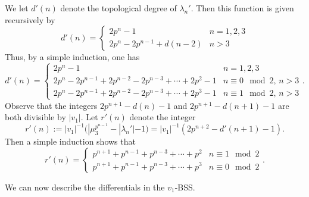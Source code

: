 We let $d'(n)$ denote the topological degree of $\lambda_n'$. Then this function is given recursively by 
\[
d'(n) = \begin{cases}
	2p^n-1 & n=1,2,3\\
	2p^n-2p^{n-1}+d(n-2) & n>3
\end{cases}
\]
Thus, by a simple induction, one has 
\[
d'(n) = \begin{cases}
	2p^n-1 & n=1,2,3\\
	2p^n-2p^{n-1}+2p^{n-2}-2p^{n-3}+\cdots + 2p^2-1 & n\equiv 0\mod 2,\, n>3\\
	2p^n-2p^{n-1}+ 2p^{n-2}-2p^{n-3}+\cdots + 2p^3-1& n\equiv 1\mod 2, \, n>3
\end{cases}.
\]
Observe that the integers $2p^{n+1}-d(n)-1$ and $2p^{n+1}-d(n+1)-1$ are both divisible by $|v_1|$. Let $r'(n)$ denote the integer 
\[
r'(n):=|v_1|^{-1}(|\mu_3^{p^{n-1}}-|\lambda_n'|-1)=|v_1|^{-1}(2p^{n+2}-d'(n+1)-1).
\] 
Then a simple induction shows that 
\[
r'(n) = \begin{cases}
	p^{n+1}+p^{n-1}+p^{n-3} +\cdots + p^2 & n\equiv 1 \mod 2\\
	p^{n+1}+p^{n-1}+p^{n-3}+\cdots + p^3 & n\equiv 0 \mod 2
\end{cases}.
\]



We can now describe the differentials in the $v_1$-BSS. 


